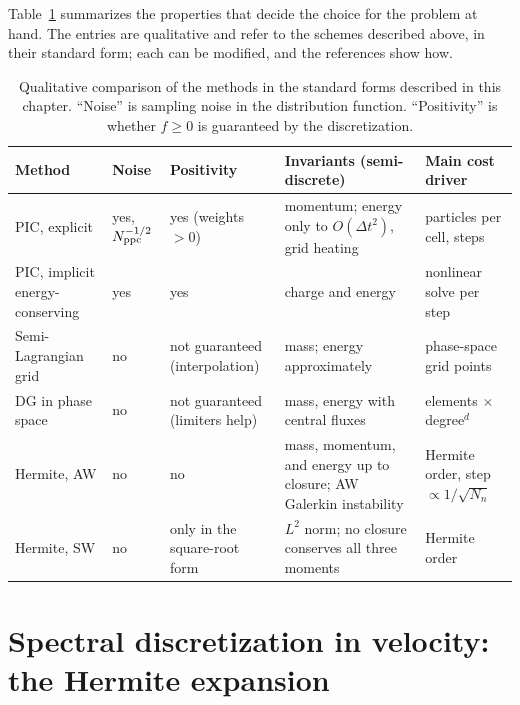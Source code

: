 Table~\ref{tab:methods} summarizes the properties that decide the choice for the problem at hand. The entries are qualitative and refer to the schemes described above, in their standard form; each can be modified, and the references show how.

\begin{table}[t]
\centering
\caption{Qualitative comparison of the methods in the standard forms described in this chapter. ``Noise'' is sampling noise in the distribution function. ``Positivity'' is whether $f\ge0$ is guaranteed by the discretization.}\label{tab:methods}
\small
\begin{tabular}{@{}p{3.2cm}p{1.6cm}p{2.3cm}p{3.5cm}p{3.4cm}@{}}\toprule
Method & Noise & Positivity & Invariants (semi-discrete) & Main cost driver\\\midrule
PIC, explicit & yes, $N_{\rm ppc}^{-1/2}$ & yes (weights $>0$) & momentum; energy only to $O(\Delta t^2)$, grid heating & particles per cell, steps\\
PIC, implicit energy-conserving & yes & yes & charge and energy & nonlinear solve per step\\
Semi-Lagrangian grid & no & not guaranteed (interpolation) & mass; energy approximately & phase-space grid points\\
DG in phase space & no & not guaranteed (limiters help) & mass, energy with central fluxes & elements $\times$ degree$^{d}$\\
Hermite, AW & no & no & mass, momentum, and energy up to closure; AW Galerkin instability & Hermite order, step $\propto1/\sqrt{N_n}$\\
Hermite, SW & no & only in the square-root form & $L^2$ norm; no closure conserves all three moments & Hermite order\\\bottomrule
\end{tabular}
\end{table}

\section{Spectral discretization in velocity: the Hermite expansion}\label{sec:hermite}

